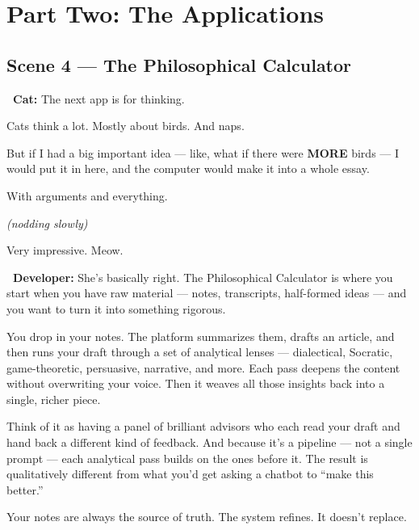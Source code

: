 \documentclass[12pt, letterpaper]{article}
\newcommand{\dev}{\textbf{\color{cogblue}\faIcon{laptop-code}\ Developer:}}
\newcommand{\cat}{\textbf{\color{catpink}\faIcon{cat}\ Cat:}}
\begin{document}
  \newpage

  \section{Part Two: The Applications}

  \subsection{Scene 4 — The Philosophical Calculator}

  \begin{catbox}
    \cat{} \large The next app is for thinking.

    \medskip
    {\large Cats think a lot. Mostly about birds. And naps.}

    \medskip
    {\large But if I had a big important idea — like, what if there were
    \textbf{MORE} birds — I would put it in here, and the computer would make it
    into a whole essay.}

    \medskip
    {\large With arguments and everything.}

    \medskip
    {\large\textit{(nodding slowly)}}

    \medskip
    {\large Very impressive. Meow.}
  \end{catbox}

  \begin{developerbox}
    \dev{} She's basically right. The Philosophical Calculator is where you start
    when you have raw material — notes, transcripts, half-formed ideas — and you
    want to turn it into something rigorous.

    \medskip
    You drop in your notes. The platform summarizes them, drafts an article, and
    then runs your draft through a set of analytical lenses — dialectical,
    Socratic, game-theoretic, persuasive, narrative, and more. Each pass deepens
    the content without overwriting your voice. Then it weaves all those insights
    back into a single, richer piece.

    \medskip
    Think of it as having a panel of brilliant advisors who each read your draft
    and hand back a different kind of feedback. And because it's a pipeline — not a
    single prompt — each analytical pass builds on the ones before it. The result
    is qualitatively different from what you'd get asking a chatbot to ``make this
    better.''

    \medskip
    Your notes are always the source of truth. The system refines. It doesn't
    replace.
  \end{developerbox}
\end{document}
